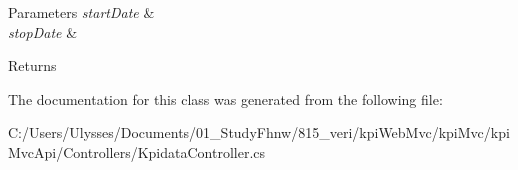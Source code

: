 \begin{DoxyParams}{Parameters}
{\em start\+Date} & \\
\hline
{\em stop\+Date} & \\
\hline
\end{DoxyParams}
\begin{DoxyReturn}{Returns}

\end{DoxyReturn}


The documentation for this class was generated from the following file\+:\begin{DoxyCompactItemize}
\item 
C\+:/\+Users/\+Ulysses/\+Documents/01\+\_\+\+Study\+Fhnw/815\+\_\+veri/kpi\+Web\+Mvc/kpi\+Mvc/kpi\+Mvc\+Api/\+Controllers/Kpidata\+Controller.\+cs\end{DoxyCompactItemize}
